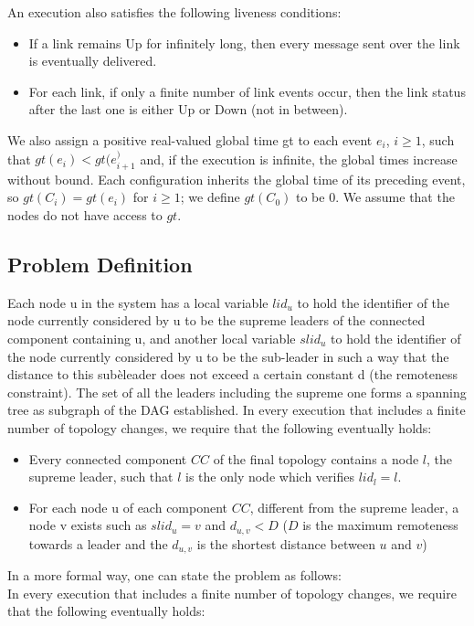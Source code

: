 \documentclass{article}
\begin{document}
An execution also satisfies the following liveness conditions:
\begin{itemize}
\item If a link remains Up for infinitely long, then every message sent over the link is eventually delivered.
\item For each link, if only a finite number of link events occur, then the link status after the last one is either Up or Down (not in between).
\end{itemize}

We also assign a positive real-valued global time gt to each event $e_i$, $i ≥ 1$, such that $gt(e_i) < gt(e_{i + 1}^)$ and, if the execution is infinite, the global times increase without bound. Each configuration inherits the global time of its preceding event, so $gt(C_i) = gt(e_i)$ for $i \geq 1$; we define $gt(C_0)$ to be $0$. We assume that the nodes do not have access to $gt$.

\subsection{Problem Definition}
Each node u in the system has a local variable $lid_{u}$ to hold the identifier of the node currently considered by u to be the supreme leaders of the connected component containing u, and another local variable $slid_u$ to hold the identifier of the node currently considered by u to be the sub-leader in such a way that the distance to this subèleader does not exceed a certain constant d (the remoteness constraint). The set of all the leaders including the supreme one forms a spanning tree as subgraph of the DAG established.
In every execution that includes a finite number of topology changes, we require that the following eventually holds:
\begin{itemize}
\item Every connected component $CC$ of the final topology contains a node $l$, the supreme leader, such that $l$ is the only node which verifies $ lid_{l} = l $.
\item For each node u of each component $CC$, different from the supreme leader, a node v exists such as $slid_{u} = v$ and $d_{u,v} < D$ ($D$ is the maximum remoteness towards a leader and the $ d_{u,v} $ is the shortest distance between $u$ and $v$)
\end{itemize}

In a more formal way, one can state the problem as follows:\\
In every execution that includes a finite number of topology changes, we require that the following eventually holds:
\end{document}
